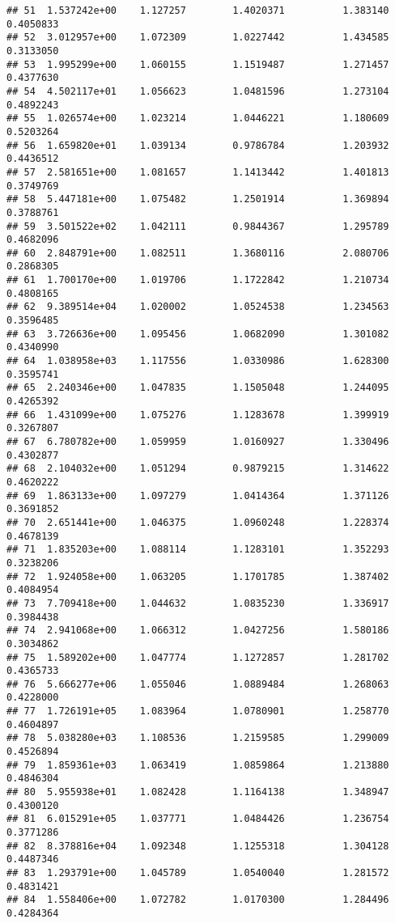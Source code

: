 \documentclass[]{article}
\begin{document}
\begin{verbatim}
## 51  1.537242e+00    1.127257        1.4020371          1.383140 0.4050833
## 52  3.012957e+00    1.072309        1.0227442          1.434585 0.3133050
## 53  1.995299e+00    1.060155        1.1519487          1.271457 0.4377630
## 54  4.502117e+01    1.056623        1.0481596          1.273104 0.4892243
## 55  1.026574e+00    1.023214        1.0446221          1.180609 0.5203264
## 56  1.659820e+01    1.039134        0.9786784          1.203932 0.4436512
## 57  2.581651e+00    1.081657        1.1413442          1.401813 0.3749769
## 58  5.447181e+00    1.075482        1.2501914          1.369894 0.3788761
## 59  3.501522e+02    1.042111        0.9844367          1.295789 0.4682096
## 60  2.848791e+00    1.082511        1.3680116          2.080706 0.2868305
## 61  1.700170e+00    1.019706        1.1722842          1.210734 0.4808165
## 62  9.389514e+04    1.020002        1.0524538          1.234563 0.3596485
## 63  3.726636e+00    1.095456        1.0682090          1.301082 0.4340990
## 64  1.038958e+03    1.117556        1.0330986          1.628300 0.3595741
## 65  2.240346e+00    1.047835        1.1505048          1.244095 0.4265392
## 66  1.431099e+00    1.075276        1.1283678          1.399919 0.3267807
## 67  6.780782e+00    1.059959        1.0160927          1.330496 0.4302877
## 68  2.104032e+00    1.051294        0.9879215          1.314622 0.4620222
## 69  1.863133e+00    1.097279        1.0414364          1.371126 0.3691852
## 70  2.651441e+00    1.046375        1.0960248          1.228374 0.4678139
## 71  1.835203e+00    1.088114        1.1283101          1.352293 0.3238206
## 72  1.924058e+00    1.063205        1.1701785          1.387402 0.4084954
## 73  7.709418e+00    1.044632        1.0835230          1.336917 0.3984438
## 74  2.941068e+00    1.066312        1.0427256          1.580186 0.3034862
## 75  1.589202e+00    1.047774        1.1272857          1.281702 0.4365733
## 76  5.666277e+06    1.055046        1.0889484          1.268063 0.4228000
## 77  1.726191e+05    1.083964        1.0780901          1.258770 0.4604897
## 78  5.038280e+03    1.108536        1.2159585          1.299009 0.4526894
## 79  1.859361e+03    1.063419        1.0859864          1.213880 0.4846304
## 80  5.955938e+01    1.082428        1.1164138          1.348947 0.4300120
## 81  6.015291e+05    1.037771        1.0484426          1.236754 0.3771286
## 82  8.378816e+04    1.092348        1.1255318          1.304128 0.4487346
## 83  1.293791e+00    1.045789        1.0540040          1.281572 0.4831421
## 84  1.558406e+00    1.072782        1.0170300          1.284496 0.4284364

\end{verbatim}
\end{document}
